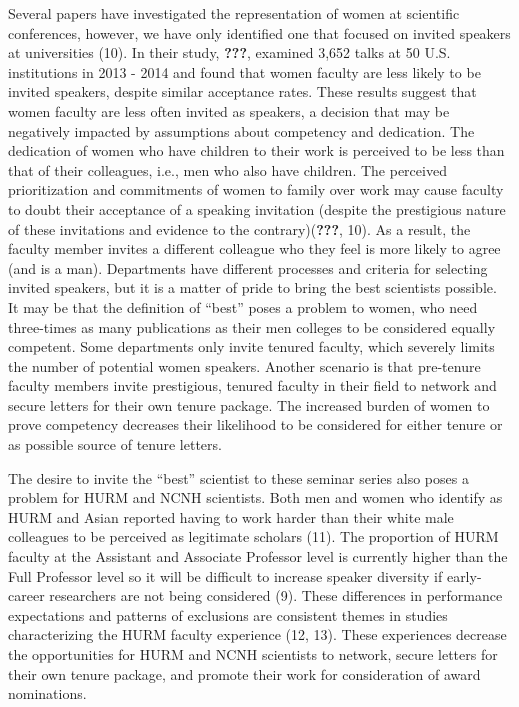 \documentclass[10pt,]{article}
\begin{document}
Several papers have investigated the representation of women at
scientific conferences, however, we have only identified one that
focused on invited speakers at universities (10). In their study,
\textbf{???}, examined 3,652 talks at 50 U.S. institutions in 2013 -
2014 and found that women faculty are less likely to be invited
speakers, despite similar acceptance rates. These results suggest that
women faculty are less often invited as speakers, a decision that may be
negatively impacted by assumptions about competency and dedication. The
dedication of women who have children to their work is perceived to be
less than that of their colleagues, i.e., men who also have children.
The perceived prioritization and commitments of women to family over
work may cause faculty to doubt their acceptance of a speaking
invitation (despite the prestigious nature of these invitations and
evidence to the contrary)({\textbf{???}}, 10). As a result, the faculty
member invites a different colleague who they feel is more likely to
agree (and is a man). Departments have different processes and criteria
for selecting invited speakers, but it is a matter of pride to bring the
best scientists possible. It may be that the definition of ``best''
poses a problem to women, who need three-times as many publications as
their men colleges to be considered equally competent. Some departments
only invite tenured faculty, which severely limits the number of
potential women speakers. Another scenario is that pre-tenure faculty
members invite prestigious, tenured faculty in their field to network
and secure letters for their own tenure package. The increased burden of
women to prove competency decreases their likelihood to be considered
for either tenure or as possible source of tenure letters.

The desire to invite the ``best'' scientist to these seminar series also
poses a problem for HURM and NCNH scientists. Both men and women who
identify as HURM and Asian reported having to work harder than their
white male colleagues to be perceived as legitimate scholars (11). The
proportion of HURM faculty at the Assistant and Associate Professor
level is currently higher than the Full Professor level so it will be
difficult to increase speaker diversity if early-career researchers are
not being considered (9). These differences in performance expectations
and patterns of exclusions are consistent themes in studies
characterizing the HURM faculty experience (12, 13). These experiences
decrease the opportunities for HURM and NCNH scientists to network,
secure letters for their own tenure package, and promote their work for
consideration of award nominations.
\end{document}
